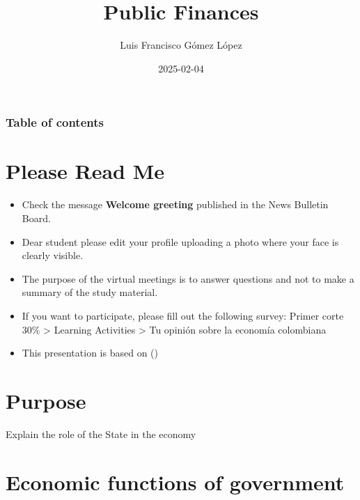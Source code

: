 \documentclass[
  ignorenonframetext,
  english,
]{beamer}
\title{Public Finances}
\author{Luis Francisco Gómez López}
\date{2025-02-04}
\institute{FAEDIS}
\renewcommand*\contentsname{Table of contents}
\newcommand\contentsname{Table of contents}
\begin{document}
\frame{\titlepage}

\renewcommand*\contentsname{Table of contents}
\begin{frame}[allowframebreaks]
  \frametitle{Table of contents}
  \setcounter{tocdepth}{3}
  \tableofcontents
\end{frame}

\section{Please Read Me}\label{please-read-me}

\begin{frame}{}
\label{section}
\begin{itemize}
\item
  Check the message \textbf{Welcome greeting} published in the News
  Bulletin Board.
\item
  Dear student please edit your profile uploading a photo where your
  face is clearly visible.
\item
  The purpose of the virtual meetings is to answer questions and not to
  make a summary of the study material.
\item
  If you want to participate, please fill out the following survey:
  Primer corte 30\% \textgreater{} Learning Activities \textgreater{} Tu
  opinión sobre la economía colombiana
\item
  This presentation is based on
  ()
\end{itemize}
\end{frame}

\section{Purpose}\label{purpose}

\begin{frame}{}
\label{section-1}
Explain the role of the State in the economy
\end{frame}

\section{Economic functions of
government}\label{economic-functions-of-government}
\end{document}

